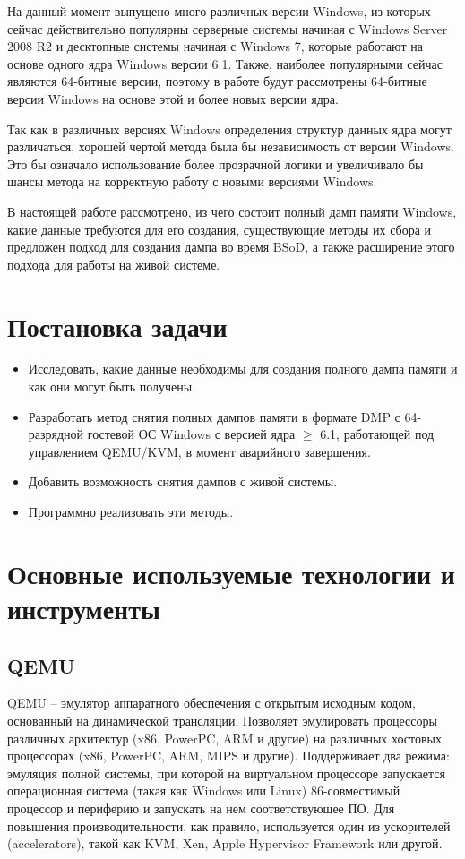 \documentclass{mipt-thesis-bs}
\begin{document}
На данный момент выпущено много различных версии Windows, из которых сейчас действительно популярны серверные системы начиная с Windows Server 2008 R2 и десктопные системы начиная с Windows 7, которые работают на основе одного ядра Windows версии 6.1. Также, наиболее популярными сейчас являются 64-битные версии, поэтому в работе будут рассмотрены 64-битные версии Windows на основе этой и более новых версии ядра.

Так как в различных версиях Windows определения структур данных ядра могут различаться\cite{kprcb}\cite{win10-struct}, хорошей чертой метода была бы независимость от версии Windows. Это бы означало использование более прозрачной логики и увеличивало бы шансы метода на корректную работу с новыми версиями Windows.

В настоящей работе рассмотрено, из чего состоит полный дамп памяти Windows, какие данные требуются для его создания, существующие методы их сбора и предложен подход для создания дампа во время BSoD, а также расширение этого подхода для работы на живой системе.

\chapter{Постановка задачи}

\begin{itemize}
\item Исследовать, какие данные необходимы для создания полного дампа памяти и как они могут быть получены.
\item Разработать метод снятия полных дампов памяти в формате DMP с 64-разрядной гостевой ОС Windows с версией ядра $\geqslant$ 6.1, работающей под управлением QEMU/KVM, в момент аварийного завершения.
\item Добавить возможность снятия дампов с живой системы.
\item Программно реализовать эти методы.
\end{itemize}

\chapter{Основные используемые технологии и инструменты}

\section*{QEMU}

QEMU -- эмулятор аппаратного обеспечения с открытым исходным кодом, основанный на динамической трансляции. Позволяет эмулировать процессоры различных архитектур (x86, PowerPC, ARM и другие) на различных хостовых процессорах (x86, PowerPC, ARM, MIPS и другие). Поддерживает два режима: эмуляция полной системы, при которой на виртуальном процессоре запускается операционная система (такая как Windows или Linux) 86-совместимый процессор и периферию и запускать на нем соответствующее ПО\cite{qemu-bellard}. Для повышения производительности, как правило, используется один из ускорителей (accelerators), такой как KVM, Xen, Apple Hypervisor Framework или другой\cite{qemu-ibm}.
\end{document}
